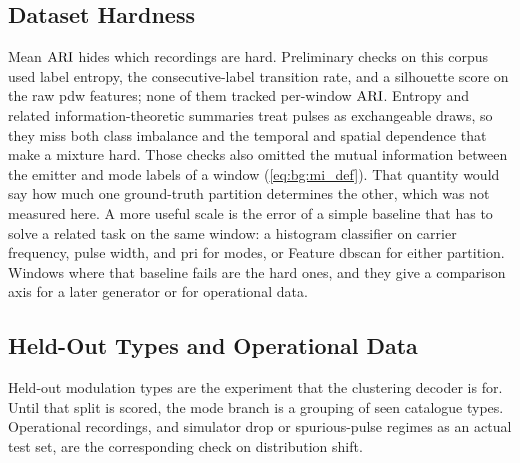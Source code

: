 \subsection{Dataset Hardness}\label{sec:concl:future:hardness}

Mean $\mathrm{ARI}$ hides which recordings are hard.
Preliminary checks on this corpus used label entropy, the consecutive-label transition rate, and a silhouette score on the raw \gls{pdw} features; none of them tracked per-window $\mathrm{ARI}$.
Entropy and related information-theoretic summaries treat pulses as exchangeable draws, so they miss both class imbalance and the temporal and spatial dependence that make a mixture hard.
Those checks also omitted the mutual information between the emitter and mode labels of a window (\cref{eq:bg:mi_def}).
That quantity would say how much one ground-truth partition determines the other, which was not measured here.
A more useful scale is the error of a simple baseline that has to solve a related task on the same window: a histogram classifier on carrier frequency, pulse width, and \gls{pri} for modes, or Feature \gls{dbscan} for either partition.
Windows where that baseline fails are the hard ones, and they give a comparison axis for a later generator or for operational data.

\subsection{Held-Out Types and Operational Data}\label{sec:concl:future:shift}

Held-out modulation types are the experiment that the clustering decoder is for.
Until that split is scored, the mode branch is a grouping of seen catalogue types.
Operational recordings, and simulator drop or spurious-pulse regimes as an actual test set, are the corresponding check on distribution shift.
